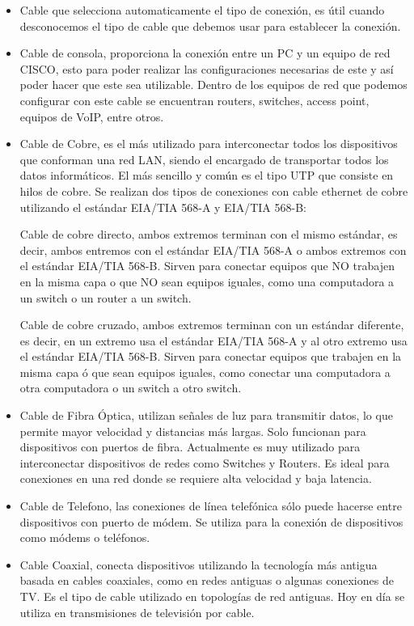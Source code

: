 \documentclass{article}
\begin{document}
\begin{itemize}
    \item Cable que selecciona automaticamente el tipo de conexión, es útil cuando desconocemos el tipo de cable que debemos usar para establecer la conexión. 
    \item Cable de consola,  proporciona la conexión entre un PC y un equipo de red CISCO, esto para poder realizar las configuraciones necesarias de este y así poder hacer que este sea utilizable. Dentro de los equipos de red que podemos configurar con este cable se encuentran routers, switches, access point, equipos de VoIP, entre otros.
    \item Cable de Cobre, es el más utilizado para interconectar todos los dispositivos que conforman una red LAN, siendo el encargado de transportar todos los datos informáticos. El más sencillo y común es el tipo UTP que consiste en hilos de cobre. Se realizan dos tipos de conexiones con cable ethernet de cobre utilizando el estándar EIA/TIA 568-A y EIA/TIA 568-B: 

        Cable de cobre directo, ambos extremos terminan con el mismo estándar, es decir, ambos entremos con el estándar EIA/TIA 568-A o ambos extremos con el estándar EIA/TIA 568-B. Sirven para conectar equipos que NO trabajen en la misma capa o que NO sean equipos iguales, como una computadora a un switch o un router a un switch.

        Cable de cobre cruzado, ambos extremos terminan con un estándar diferente, es decir, en un extremo usa el estándar EIA/TIA 568-A y al otro extremo usa el estándar EIA/TIA 568-B. Sirven para conectar equipos que trabajen en la misma capa ó que sean equipos iguales, como conectar una computadora a otra computadora o un switch a otro switch.

    \item Cable de Fibra Óptica, utilizan señales de luz para transmitir datos, lo que permite mayor velocidad y distancias más largas. Solo funcionan para dispositivos con puertos de fibra. Actualmente es muy utilizado para interconectar dispositivos de redes como Switches y Routers. Es ideal para conexiones en una red donde se requiere alta velocidad y baja latencia.

    \item Cable de Telefono, las conexiones de línea telefónica sólo puede hacerse entre dispositivos con puerto de módem. Se utiliza para la conexión de dispositivos como módems o teléfonos.

    \item Cable Coaxial, conecta dispositivos utilizando la tecnología más antigua basada en cables coaxiales, como en redes antiguas o algunas conexiones de TV. Es el tipo de cable utilizado en topologías de red antiguas. Hoy en día se utiliza en transmisiones de televisión por cable.


\end{itemize}
\end{document}
